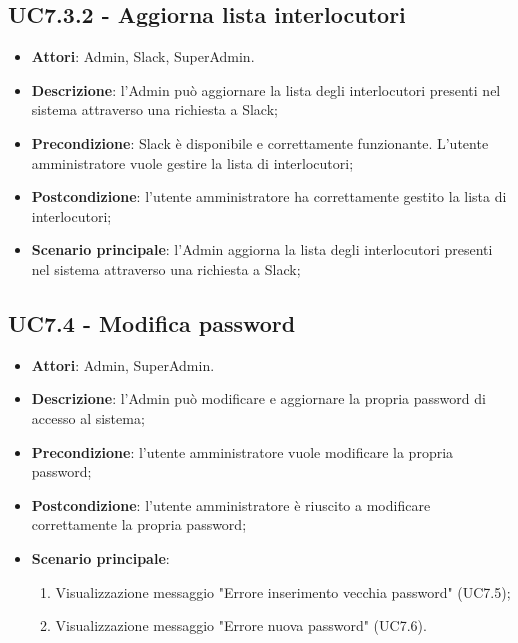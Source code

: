 \documentclass[../AnalisiDeiRequisiti_v4.0.0.tex]{subfiles}
\begin{document}
\subsection{UC7.3.2 - Aggiorna lista interlocutori} 
\label{sssec:UC7.3.2} 
\begin{itemize} 
\item \textbf{Attori}: Admin, Slack, SuperAdmin.
\item \textbf{Descrizione}: l'Admin può aggiornare la lista degli interlocutori presenti nel sistema attraverso una richiesta a Slack;
\item \textbf{Precondizione}: Slack è disponibile e correttamente funzionante. L'utente amministratore vuole gestire la lista di interlocutori;
\item \textbf{Postcondizione}: l'utente amministratore ha correttamente gestito la lista di interlocutori;
\item \textbf{Scenario principale}: l'Admin aggiorna la lista degli interlocutori presenti nel sistema attraverso una richiesta a Slack;
\end{itemize} 
\subsection{UC7.4 - Modifica password} 
\label{sssec:UC7.4} 
\begin{itemize} 
\item \textbf{Attori}: Admin, SuperAdmin.
\item \textbf{Descrizione}: l'Admin può modificare e aggiornare la propria password di accesso al sistema;
\item \textbf{Precondizione}: l'utente amministratore vuole modificare la propria password;
\item \textbf{Postcondizione}: l'utente amministratore è riuscito a modificare correttamente la propria password;
\item \textbf{Scenario principale}: \begin{enumerate}\item Visualizzazione messaggio "Errore inserimento vecchia password" (UC7.5);\item Visualizzazione messaggio "Errore nuova password" (UC7.6). 
 \end{enumerate}
\end{itemize} 
\end{document}
